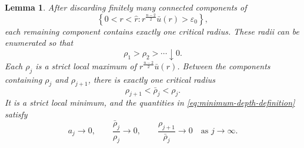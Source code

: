 \documentclass[11pt]{article}
\numberwithin{equation}{section}
\newtheorem{lemma}[theorem]{Lemma}
\theoremstyle{remark}
\newcommand{\eps}{\varepsilon}
\begin{document}
\par
\begin{lemma}\label{lem:peak-minimum-radii}
After discarding finitely many connected components of
\[
 \left\{
 0<r<\widehat r:r^{\frac{n-2}{2}}\bar u(r)>\eps_0
 \right\},
\]
each remaining component contains exactly one critical radius.  These radii
can be enumerated so that
\[
 \rho_1>\rho_2>\cdots\downarrow0.
\]
Each \(\rho_j\) is a strict local maximum of \(r^{\frac{n-2}{2}}\bar u(r)\).  Between the
components containing \(\rho_j\) and \(\rho_{j+1}\), there is exactly one
critical radius
\[
 \rho_{j+1}<\bar\rho_j<\rho_j.
\]
It is a strict local minimum, and the quantities in
\eqref{eq:minimum-depth-definition} satisfy
\begin{equation}\label{eq:peak-minimum-separation}
 a_j\to0,
 \qquad
 \frac{\bar\rho_j}{\rho_j}\to0,
 \qquad
 \frac{\rho_{j+1}}{\bar\rho_j}\to0
 \quad\text{as }j\to\infty.
\end{equation}
\end{lemma}
\end{document}
